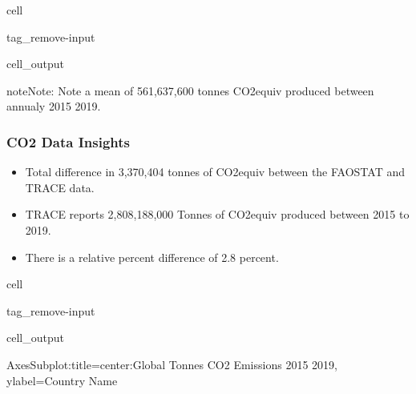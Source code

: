 \documentclass[letterpaper,10pt,english]{jupyterBook}
\begin{document}
\begin{sphinxuseclass}{cell}
\begin{sphinxuseclass}{tag_remove-input}
\begin{sphinxVerbatimOutput}
\begin{sphinxuseclass}{cell_output}
\end{sphinxuseclass}\end{sphinxVerbatimOutput}

\end{sphinxuseclass}
\end{sphinxuseclass}
\begin{sphinxadmonition}{note}{Note:}
\sphinxAtStartPar
Note a mean of 561,637,600 tonnes CO2equiv produced between annualy 2015 \sphinxhyphen{} 2019.
\end{sphinxadmonition}


\subsubsection{CO2 Data Insights}
\label{\detokenize{notebooks/hidden_post:co2-data-insights}}\begin{itemize}
\item {} 
\sphinxAtStartPar
Total difference in 3,370,404 tonnes of CO2equiv between the FAOSTAT and TRACE data.

\item {} 
\sphinxAtStartPar
TRACE reports 2,808,188,000 Tonnes of CO2equiv produced between 2015 to 2019.

\item {} 
\sphinxAtStartPar
There is a relative percent difference of \sphinxhyphen{}2.8 percent.

\end{itemize}

\begin{sphinxuseclass}{cell}
\begin{sphinxuseclass}{tag_remove-input}\begin{sphinxVerbatimOutput}

\begin{sphinxuseclass}{cell_output}
\begin{sphinxVerbatim}[commandchars=\\\{\}]
\PYGZlt{}AxesSubplot:title=\PYGZob{}\PYGZsq{}center\PYGZsq{}:\PYGZsq{}Global Tonnes CO2 Emissions 2015 \PYGZhy{} 2019\PYGZsq{}\PYGZcb{}, ylabel=\PYGZsq{}Country Name\PYGZsq{}\PYGZgt{}
\end{sphinxVerbatim}

\noindent{}

\end{sphinxuseclass}\end{sphinxVerbatimOutput}

\end{sphinxuseclass}
\end{sphinxuseclass}
\end{document}

